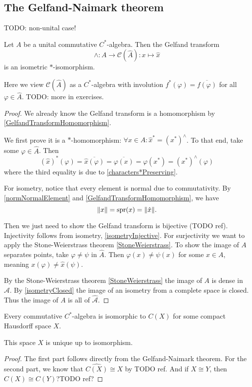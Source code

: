 \subsection{The Gelfand-Naimark theorem}
TODO: non-unital case!
\begin{theorem} \label{GelfandNaimarkCommutative}
Let $A$ be a unital commutative $C^*$-algebra. Then the Gelfand transform
\[ \wedge: A\to\mathcal{C}(\hat{A}): x\mapsto \hat{x} \]
is an isometric $*$-isomorphism.
\end{theorem}
Here we view $\mathcal{C}(\hat{A})$ as a $C^*$-algebra with involution $f^*(\varphi) = \overline{f(\varphi)}$ for all $\varphi\in\hat{A}$. TODO: more in exercises.
\begin{proof}
We already know the Gelfand transform is a homomorphism by \ref{GelfandTransformHomomorphism}.

We first prove it is a $*$-homomorphism: $\forall x\in A: \hat{x}^* = (x^*)^\wedge$. To that end, take some $\varphi\in\hat{A}$. Then
\[ (\hat{x})^*(\varphi) = \overline{\hat{x}(\varphi)} = \overline{\varphi(x)} = \varphi(x^*) = (x^*)^\wedge(\varphi) \]
where the third equality is due to \ref{characters*Preserving}.

For isometry, notice that every element is normal due to commutativity. By \ref{normNormalElement} and \ref{GelfandTransformHomomorphism}, we have
\[ \lVert x\rVert = \operatorname{spr}(x) = \lVert\hat{x}\rVert. \]

Then we just need to show the Gelfand transform is bijective (TODO ref). Injectivity follows from isometry, \ref{isometryInjective}. For surjectivity we want to apply the Stone-Weierstrass theorem \ref{StoneWeierstrass}. To show the image of $A$ separates points, take $\varphi \neq \psi$ in $\hat{A}$. Then $\varphi(x) \neq \psi(x)$ for some $x\in A$, meaning $\hat{x}(\varphi) \neq \hat{x}(\psi)$. 

By the Stone-Weierstrass theorem \ref{StoneWeierstrass} the image of $A$ is dense in $\mathcal{\hat{A}}$. By \ref{isometryClosed} the image of an isometry from a complete space is closed. Thus the image of $A$ is all of $\mathcal{\hat{A}}$.
\end{proof}
\begin{corollary}
Every commutative $C^*$-algebra is isomorphic to $C(X)$ for some compact Hausdorff space $X$.

This space $X$ is unique up to isomorphism.
\end{corollary}
\begin{proof}
The first part follows directly from the Gelfand-Naimark theorem. For the second part, we know that $\widehat{C(X)}\cong X$ by TODO ref. And if $X \cong Y$, then $C(X) \cong C(Y)$?TODO ref?
\end{proof}

